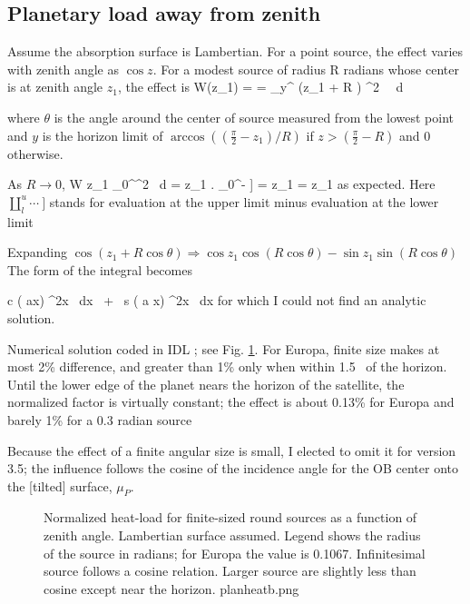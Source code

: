 \documentclass{article}
\begin{document}
\subsection{Planetary load away from zenith \label{obliq} }
Assume the absorption surface is Lambertian. For a point source, the effect
varies with zenith angle as $\cos z$. For a modest source of radius R
radians whose center is at zenith angle $z_1$, the effect is 
\qbn W(z_1) = =  \int_y^\pi \cos
(z_1 + R \cos \theta ) \cdot \sin^2 \theta \ \ d \theta \qen

where $\theta$ is the angle around the center of source measured from the lowest
point and $y $ is the horizon limit of $\arccos \left( (\frac{\pi}{2}-z_1)/R
\right)$ if $z > (\frac{\pi}{2}-R)$ and 0 otherwise.

As $R \rightarrow 0$, 
\qb W  \rightarrow  {} \cos z_1 \int_0^\pi \sin^2 \theta \ d \theta
=  \cos z_1 \left. \coprod_0^\pi {}- \right] 
=  \cos z_1 \cdot {}  = \cos z_1  \qe
as expected. Here $ \coprod _l^u \cdots \ ] $ stands for evaluation at the upper
  limit minus evaluation at the lower limit

\vspace{2mm}

Expanding $ \cos (z_1 + R \cos \theta ) \Rightarrow  \cos z_1 \cos( R \cos \theta ) -   \sin z_1 \sin( R \cos \theta ) $ The form of the integral becomes 

\qb c \int \cos ( a\cos x) \sin^2x \ dx \ + \ s \int  \sin ( a \cos x) \sin^2x \ dx \qe
 for which I could not find an analytic solution.

Numerical solution coded in IDL ; see Fig. \ref{planheatb}. For
Europa, finite size makes at most 2\% difference, and greater than 1\% only when
within 1.5\qd~ of the horizon.  Until the lower edge of the planet nears the
horizon of the satellite, the normalized factor is virtually constant; the
effect is about 0.13\% for Europa and barely 1\% for a 0.3 radian source

Because the effect of a finite angular size is small, I elected to omit it for
version 3.5; the influence follows the cosine of the incidence angle for the OB
center onto the [tilted] surface, $\mu_P$.
 
\begin{figure}[!ht] 
\caption[Effect of extended size of planet]{Normalized heat-load for
  finite-sized round sources as a function of zenith angle. Lambertian surface
  assumed. Legend shows the radius of the source in radians; for Europa the
  value is 0.1067. Infinitesimal source follows a cosine relation. Larger source
  are slightly less than cosine except near the horizon.
\label{planheatb}  planheatb.png }
\end{figure} 
\end{document}
